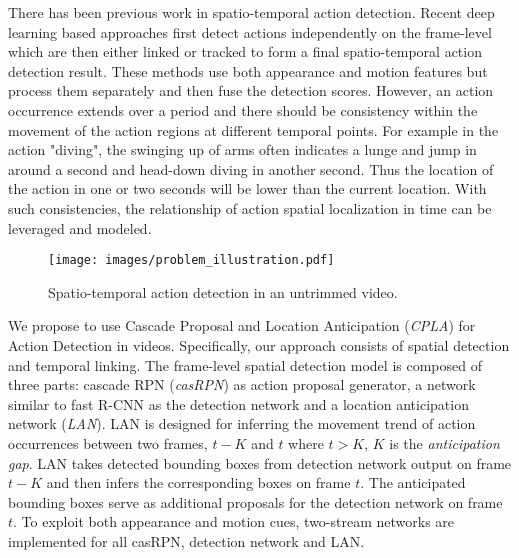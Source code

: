 \documentclass{bmvc2k}
\begin{document}
There has been previous work in spatio-temporal action detection. Recent deep learning based approaches \cite{gkioxari2015finding,weinzaepfel2015learning,suman16bmvc,peng2016multi} first detect actions independently on the frame-level which are then either linked or tracked to form a final spatio-temporal action detection result. These methods use both appearance and motion features but process them separately and then fuse the detection scores. However, an action occurrence extends over a period and there should be consistency within the movement of the action regions at different temporal points.
For example in the action "diving", the swinging up of arms often indicates a lunge and jump in around a second and head-down diving in another second. Thus the location of the action in one or two seconds will be lower than the current location. With such consistencies, the relationship of action spatial localization in time can be leveraged and modeled.



\begin{figure}
\centering
\texttt{[image: images/problem\_illustration.pdf]}
\caption{Spatio-temporal action detection in an untrimmed video.}
\label{fig:prob_illu}
\end{figure}



We propose to use Cascade Proposal and Location Anticipation (\textit{CPLA}) for Action Detection in videos. Specifically, our approach consists of spatial detection and temporal linking. The frame-level spatial detection model is composed of three parts: cascade RPN (\textit{casRPN}) as action proposal generator, a network similar to fast R-CNN as the detection network and a location anticipation network (\textit{LAN}). LAN is designed for inferring the movement trend of action occurrences between two frames, $t-K$ and $t$ where $t>K$, $K$ is the \textit{anticipation gap}. LAN takes detected bounding boxes from detection network output on frame $t-K$ and then infers the corresponding boxes on frame $t$. The anticipated bounding boxes serve as additional proposals for the detection network on frame $t$. To exploit both appearance and motion cues, two-stream networks are implemented for all casRPN, detection network and LAN.
\end{document}
